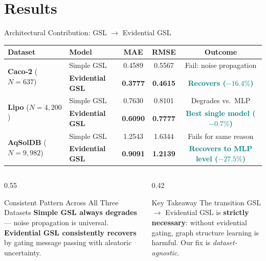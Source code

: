 \documentclass[aspectratio=169]{beamer}
\begin{document}
\section{Results}

\begin{frame}[t]{Architectural Contribution: GSL $\to$ Evidential GSL}
\begin{center}
\footnotesize
\setlength{\tabcolsep}{5pt}
\begin{tabular}{llccc}
\toprule
\textbf{Dataset} & \textbf{Model} & \textbf{MAE} & \textbf{RMSE} & \textbf{Outcome} \\
\midrule
\multirow{2}{*}{\textbf{Caco-2} ($N{=}637$)}
  & Simple GSL        & 0.4589 & 0.5567 & \textcolor{red!70!black}{Fail: noise propagation} \\
  & \textbf{Evidential GSL} & \textbf{0.3777} & \textbf{0.4615} & \textcolor{teal}{\textbf{Recovers ($-16.4\%$)}} \\
\midrule
\multirow{2}{*}{\textbf{Lipo} ($N{=}4{,}200$)}
  & Simple GSL        & 0.7630 & 0.8101 & \textcolor{red!70!black}{Degrades vs.\ MLP} \\
  & \textbf{Evidential GSL} & \textbf{0.6090} & \textbf{0.7777} & \textcolor{teal}{\textbf{Best single model ($-0.7\%$)}} \\
\midrule
\multirow{2}{*}{\textbf{AqSolDB} ($N{=}9{,}982$)}
  & Simple GSL        & 1.2543 & 1.6344 & \textcolor{red!70!black}{Fails for same reason} \\
  & \textbf{Evidential GSL} & \textbf{0.9091} & \textbf{1.2139} & \textcolor{teal}{\textbf{Recovers to MLP level ($-27.5\%$)}} \\
\bottomrule
\end{tabular}
\end{center}
\vspace{6pt}
\begin{columns}[T]
\begin{column}{0.55\textwidth}
\begin{alertblock}{Consistent Pattern Across All Three Datasets}
\footnotesize \textbf{Simple GSL always degrades} — noise propagation is universal. \textbf{Evidential GSL consistently recovers} by gating message passing with aleatoric uncertainty.
\end{alertblock}
\end{column}
\begin{column}{0.42\textwidth}
\begin{block}{Key Takeaway}
\footnotesize The transition GSL $\to$ Evidential GSL is \textbf{strictly necessary}: without evidential gating, graph structure learning is harmful. Our fix is \emph{dataset-agnostic}.
\end{block}
\end{column}
\end{columns}
\end{frame}
\end{document}
